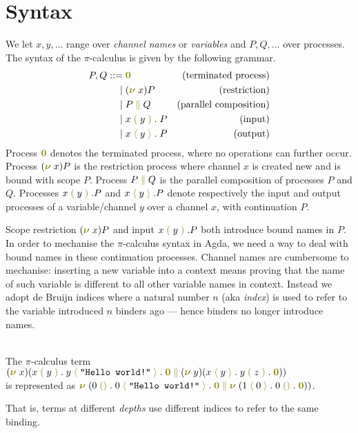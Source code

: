 \documentclass[a4paper,UKenglish,cleveref, autoref, thm-restate,authorcolumns]{lipics-v2019}
\theoremstyle{definition}
\newcommand{\picalc}{$\pi$-calculus}
\newcommand{\constr}[1]{\textcolor{olive}{\operatorname{#1}}}
\newcommand{\PO}{\constr{\mathbf{0}}}
\newcommand{\comp}[2]{#1 \; \constr{\parallel} \; #2}
\newcommand{\new}{\constr{\boldsymbol{\nu}} \;}
\newcommand{\send}[2]{#1 \; \constr{\langle} \; #2 \;\constr{\rangle} \;}
\newcommand{\sendp}[2]{#1 \; \constr{\langle} \; #2 \; \constr{\rangle} \;}
\newcommand{\recv}[1]{#1 \; \constr{\mathbb{()}} \;}
\newcommand{\recvp}[2]{#1 \; \constr{(} \; #2 \; \constr{)} \;}
\begin{document}
\section{Syntax}
\label{syntax}
We let $x, y,\ldots$ range over \emph{channel names} or \emph{variables} and
$P, Q,\ldots$ over processes.
The syntax of the \picalc{} \cite{Sangio01} is given by the following grammar.
\begin{equation*}
  \begin{split}
    P,Q ::=      & \; \PO       &\text{(terminated process)}  \\
                |& \; (\new{}x)  P   & \text{(restriction)} \\
                |& \; \comp{P}{Q}  & \text{(parallel composition)} \\
                |& \; \recvp{x}{y}. \; P  & \text{(input)} \\
                |& \; \sendp{x}{y}. \; P   &\text{(output)}
  \end{split}
\end{equation*}
Process $\PO$ denotes the terminated process, where no operations can further occur.
Process $(\new{}x)P$ is the restriction process where channel $x$ is created new and is bound with scope $P$.
Process $\comp{P}{Q}$ is the parallel composition of processes $P$ and $Q$.
Processes $\recvp{x}{y}.P$ and $\sendp{x}{y}.P$ denote respectively the input and output processes of a variable/channel $y$ over a channel $x$, with continuation $P$.

Scope restriction $(\new{}x)P$ and input $\recvp{x}{y}.P$ both introduce bound names in $P$.
In order to mechanise the \picalc{} syntax in Agda, we need a way to deal with bound names in these continuation processes.
Channel names are cumbersome to mechanise: inserting a new variable into a context means proving that the name of such variable is different to all other variable names in context.
Instead we adopt de Bruijn indices \cite{} where a natural number $n$ (aka \emph{index}) is used to refer to the variable introduced $n$ binders ago --- hence binders no longer introduce names.
\begin{example}
\hfill{}\\
The \picalc{} term \hfill{} $(\new{}x ) (\comp {\recvp{x}{y} . \; \sendp{y}{\texttt{"Hello world!"}} . \; \PO} {(\new{} y) (\sendp{x}{y} . \; \recvp{y}{z} . \; \PO)})$ \\ is represented as \hfill{} $\new{} (\comp {\recv{0} . \; \send{0}{\texttt{"Hello world!"}} . \; \PO} {\new{} (\send{1}{0} . \; \recv{0} . \; \PO)})$.
\end{example}
That is, terms at different \emph{depths} use different indices to refer to the same binding.
\end{document}
